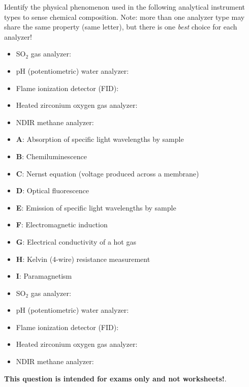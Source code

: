 

Identify the physical phenomenon used in the following analytical instrument types to sense chemical composition.  Note: more than one analyzer type may share the same property (same letter), but there is one {\it best} choice for each analyzer!

\begin{itemize}
\item{} SO$_{2}$ gas analyzer: \underbar{\hskip 50pt}
\item{} pH (potentiometric) water analyzer: \underbar{\hskip 50pt}
\item{} Flame ionization detector (FID): \underbar{\hskip 50pt}
\item{} Heated zirconium oxygen gas analyzer: \underbar{\hskip 50pt}
\item{} NDIR methane analyzer: \underbar{\hskip 50pt}
\end{itemize}

\vskip 10pt

\begin{itemize}
\item {\bf A}: Absorption of specific light wavelengths by sample
\item {\bf B}: Chemiluminescence
\item {\bf C}: Nernst equation (voltage produced across a membrane)
\item {\bf D}: Optical fluorescence
\item {\bf E}: Emission of specific light wavelengths by sample
\item {\bf F}: Electromagnetic induction
\item {\bf G}: Electrical conductivity of a hot gas
\item {\bf H}: Kelvin (4-wire) resistance measurement 
\item {\bf I}: Paramagnetism
\end{itemize}







\begin{itemize}
\item{} SO$_{2}$ gas analyzer: 
\item{} pH (potentiometric) water analyzer: 
\item{} Flame ionization detector (FID): 
\item{} Heated zirconium oxygen gas analyzer: 
\item{} NDIR methane analyzer: 
\end{itemize}







{\bf This question is intended for exams only and not worksheets!}.



